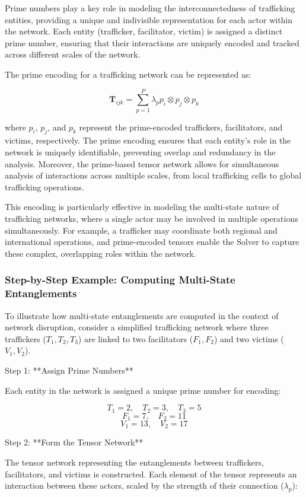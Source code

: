 \documentclass[%
 preprint, linenumbers,
 amsmath,amssymb,
 aps, physrev,
]{revtex4-2}
\begin{document}
Prime numbers play a key role in modeling the interconnectedness of trafficking entities, providing a unique and indivisible representation for each actor within the network. Each entity (trafficker, facilitator, victim) is assigned a distinct prime number, ensuring that their interactions are uniquely encoded and tracked across different scales of the network.

The prime encoding for a trafficking network can be represented as:

\[
\mathbf{T}_{ijk} = \sum_{p=1}^{P} \lambda_p p_i \otimes p_j \otimes p_k
\]

where \(p_i\), \(p_j\), and \(p_k\) represent the prime-encoded traffickers, facilitators, and victims, respectively. The prime encoding ensures that each entity’s role in the network is uniquely identifiable, preventing overlap and redundancy in the analysis. Moreover, the prime-based tensor network allows for simultaneous analysis of interactions across multiple scales, from local trafficking cells to global trafficking operations.

This encoding is particularly effective in modeling the multi-state nature of trafficking networks, where a single actor may be involved in multiple operations simultaneously. For example, a trafficker may coordinate both regional and international operations, and prime-encoded tensors enable the Solver to capture these complex, overlapping roles within the network.

\subsubsection{Step-by-Step Example: Computing Multi-State Entanglements}

To illustrate how multi-state entanglements are computed in the context of network disruption, consider a simplified trafficking network where three traffickers (\(T_1, T_2, T_3\)) are linked to two facilitators (\(F_1, F_2\)) and two victims (\(V_1, V_2\)).

Step 1: **Assign Prime Numbers**

Each entity in the network is assigned a unique prime number for encoding:

\[
T_1 = 2, \quad T_2 = 3, \quad T_3 = 5
\]
\[
F_1 = 7, \quad F_2 = 11
\]
\[
V_1 = 13, \quad V_2 = 17
\]

Step 2: **Form the Tensor Network**

The tensor network representing the entanglements between traffickers, facilitators, and victims is constructed. Each element of the tensor represents an interaction between these actors, scaled by the strength of their connection (\(\lambda_p\)):
\end{document}
